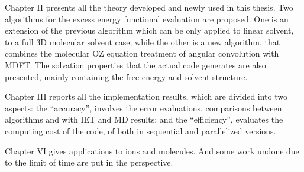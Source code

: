 Chapter II presents all the theory developed and newly used in this
thesis. Two algorithms for the excess energy functional evaluation
are proposed. One is an extension of the previous algorithm which
can be only applied to linear solvent, to a full 3D molecular solvent
case; while the other is a new algorithm, that combines the molecular
\acs{OZ} equation treatment of angular convolution with MDFT. The
solvation properties that the actual code generates are also presented,
mainly containing the free energy and solvent structure.

Chapter III reports all the implementation results, which are divided
into two aspects: the ``accuracy'', involves the error evaluations,
comparisons between algorithms and with \acs{IET} and \acs{MD} results;
and the ``efficiency'', evaluates the computing cost of the code,
of both in sequential and parallelized versions.

Chapter VI gives applications to ions and molecules. And some work
undone due to the limit of time are put in the perspective.
